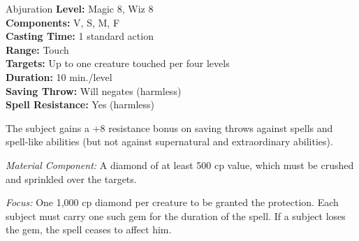 {Abjuration}
{
	\textbf{Level:}
	Magic 8, Wiz 8\\
	\textbf{Components:}
	V, S, M, F\\
	\textbf{Casting Time:}
	1 standard action\\
	\textbf{Range:}
	Touch\\
	\textbf{Targets:}
	Up to one creature touched per four levels\\
	\textbf{Duration:}
	10 min./level\\
	\textbf{Saving Throw:}
	Will negates (harmless)\\
	\textbf{Spell Resistance:}
	Yes (harmless)\\
}
{
	The subject gains a +8 resistance bonus on saving throws against spells and spell-like abilities (but not against supernatural and extraordinary abilities).

	\textit{Material Component:}
	A diamond of at least 500 cp value, which must be crushed and sprinkled over the targets.

	\textit{Focus:}
	One 1,000 cp diamond per creature to be granted the protection. Each subject must carry one such gem for the duration of the spell. If a subject loses the gem, the spell ceases to affect him.

}

